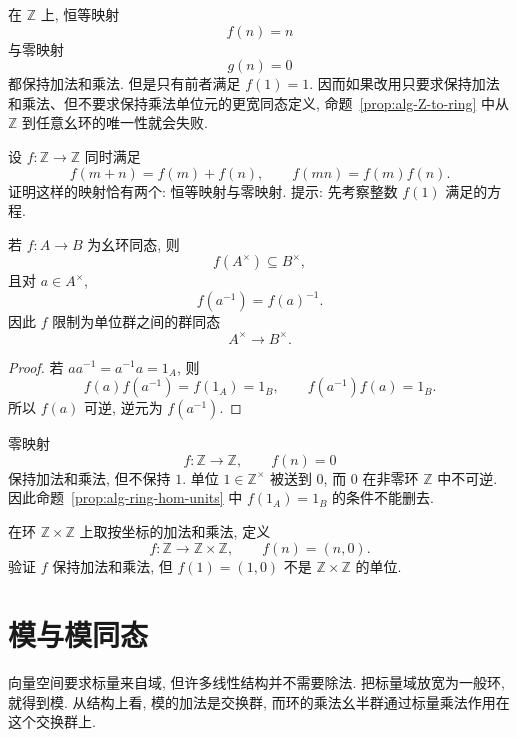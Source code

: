 \documentclass[usesamecnt, thmcnt=section, lang=cn, newtx, 10pt, scheme=chinese]{elegantbook}
\begin{document}
\begin{instance}
在 $\mathbb Z$ 上, 恒等映射
\[
 f(n)=n
\]
与零映射
\[
 g(n)=0
\]
都保持加法和乘法. 但是只有前者满足 $f(1)=1$. 因而如果改用只要求保持加法和乘法、但不要求保持乘法单位元的更宽同态定义, 命题~\ref{prop:alg-Z-to-ring} 中从 $\mathbb Z$ 到任意幺环的唯一性就会失败.
\end{instance}

\begin{exercise}\label{ex:alg-Z-unital}
设 $f:\mathbb Z\to\mathbb Z$ 同时满足
\[
 f(m+n)=f(m)+f(n),
 \qquad
 f(mn)=f(m)f(n).
\]
证明这样的映射恰有两个: 恒等映射与零映射. 提示: 先考察整数 $f(1)$ 满足的方程.
\end{exercise}

\begin{proposition}\label{prop:alg-ring-hom-units}
若 $f:A\to B$ 为幺环同态, 则
\[
 f(A^\times)\subseteq B^\times,
\]
且对 $a\in A^\times$,
\[
 f(a^{-1})=f(a)^{-1}.
\]
因此 $f$ 限制为单位群之间的群同态
\[
 A^\times\longrightarrow B^\times.
\]
\end{proposition}

\begin{proof}
若 $aa^{-1}=a^{-1}a=1_A$, 则
\[
 f(a)f(a^{-1})=f(1_A)=1_B,
 \qquad
 f(a^{-1})f(a)=1_B.
\]
所以 $f(a)$ 可逆, 逆元为 $f(a^{-1})$.
\end{proof}

\begin{instance}
零映射
\[
 f:\mathbb Z\to\mathbb Z,\qquad f(n)=0
\]
保持加法和乘法, 但不保持 $1$. 单位 $1\in\mathbb Z^\times$ 被送到 $0$, 而 $0$ 在非零环 $\mathbb Z$ 中不可逆. 因此命题~\ref{prop:alg-ring-hom-units} 中 $f(1_A)=1_B$ 的条件不能删去.
\end{instance}

\begin{exercise}\label{ex:alg-ring-hom-unital-units}
在环 $\mathbb Z\times\mathbb Z$ 上取按坐标的加法和乘法, 定义
\[
 f:\mathbb Z\to\mathbb Z\times\mathbb Z,
 \qquad
 f(n)=(n,0).
\]
验证 $f$ 保持加法和乘法, 但 $f(1)=(1,0)$ 不是 $\mathbb Z\times\mathbb Z$ 的单位.
\end{exercise}

\section{模与模同态}

向量空间要求标量来自域, 但许多线性结构并不需要除法. 把标量域放宽为一般环, 就得到模. 从结构上看, 模的加法是交换群, 而环的乘法幺半群通过标量乘法作用在这个交换群上.
\end{document}
